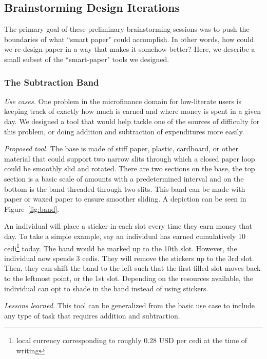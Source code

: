 \documentclass{sig-alternate}
\begin{document}
\subsection{Brainstorming Design Iterations}
\label{sec:brainstorming}

The primary goal of these preliminary brainstorming sessions was to push the boundaries of what ``smart paper" could accomplish. In other words, how could we re-design paper in a way that makes it somehow better? Here, we describe a small subset of the ``smart-paper" tools we designed.

\subsubsection{The Subtraction Band}
\label{sec:subtraction}

\emph{Use cases.}
One problem in the microfinance domain for low-literate users is keeping track of exactly how much is earned and where money is spent in a given day. We designed a tool that would help tackle one of the sources of difficulty for this problem, or doing addition and subtraction of expenditures more easily.

\emph{Proposed tool.}
The base is made of stiff paper, plastic, cardboard, or other material that could support two narrow slits through which a closed paper loop could be smoothly slid and rotated. There are two sections on the base, the top section is a basic scale of amounts with a predetermined interval and on the bottom is the band threaded through two slits. This band can be made with paper or waxed paper to ensure smoother sliding. A depiction can be seen in Figure~\ref{fig:band}.

An individual will place a sticker in each slot every time they earn money that day. To take a simple example, say an individual has earned cumulatively 10 cedi\footnote{local currency corresponding to roughly 0.28 USD per cedi at the time of writing} today. The band would be marked up to the 10th slot. However, the individual now spends 3 cedis. They will remove the stickers up to the 3rd slot. Then, they can shift the band to the left such that the first filled slot moves back to the leftmost point, or the 1st slot.
Depending on the resources available, the individual can opt to shade in the band instead of using stickers.

\emph{Lessons learned.}
This tool can be generalized from the basic use case to include any type of task that requires addition and subtraction. 
\end{document}
